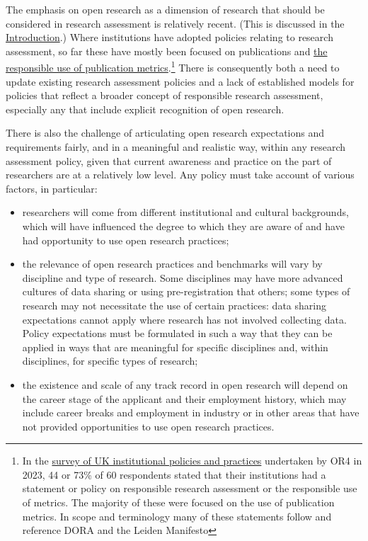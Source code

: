\documentclass[
  letterpaper,
  DIV=11,
  numbers=noendperiod,
  oneside]{scrreprt}
\begin{document}
The emphasis on open research as a dimension of research that should be
considered in research assessment is relatively recent. (This is
discussed in the \href{guide-intro.qmd}{Introduction}.) Where
institutions have adopted policies relating to research assessment, so
far these have mostly been focused on publications and
\href{https://thebibliomagician.wordpress.com/statements-of-responsible-metrics-2/}{the
responsible use of publication metrics}.\footnote{In the
  \href{https://doi.org/10.31219/osf.io/z52cn}{survey of UK
  institutional policies and practices} undertaken by OR4 in 2023, 44 or
  73\% of 60 respondents stated that their institutions had a statement
  or policy on responsible research assessment or the responsible use of
  metrics. The majority of these were focused on the use of publication
  metrics. In scope and terminology many of these statements follow and
  reference DORA and the Leiden Manifesto} There is consequently both a
need to update existing research assessment policies and a lack of
established models for policies that reflect a broader concept of
responsible research assessment, especially any that include explicit
recognition of open research.

There is also the challenge of articulating open research expectations
and requirements fairly, and in a meaningful and realistic way, within
any research assessment policy, given that current awareness and
practice on the part of researchers are at a relatively low level. Any
policy must take account of various factors, in particular:

\begin{itemize}
\item
  researchers will come from different institutional and cultural
  backgrounds, which will have influenced the degree to which they are
  aware of and have had opportunity to use open research practices;
\item
  the relevance of open research practices and benchmarks will vary by
  discipline and type of research. Some disciplines may have more
  advanced cultures of data sharing or using pre-registration that
  others; some types of research may not necessitate the use of certain
  practices: data sharing expectations cannot apply where research has
  not involved collecting data. Policy expectations must be formulated
  in such a way that they can be applied in ways that are meaningful for
  specific disciplines and, within disciplines, for specific types of
  research;
\item
  the existence and scale of any track record in open research will
  depend on the career stage of the applicant and their employment
  history, which may include career breaks and employment in industry or
  in other areas that have not provided opportunities to use open
  research practices.
\end{itemize}
\end{document}
